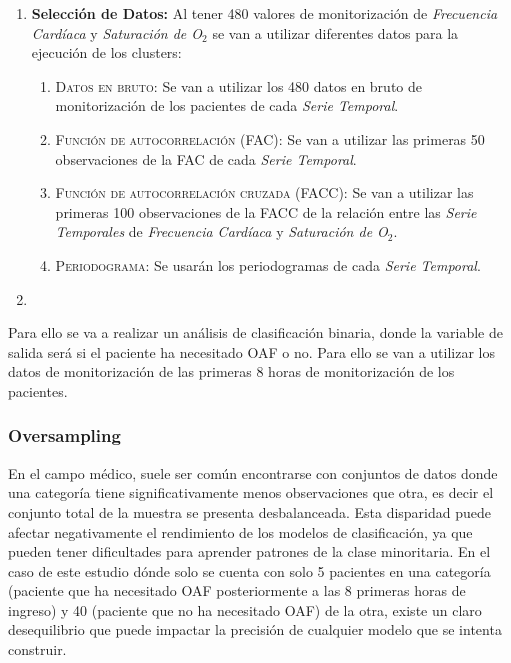 \begin{enumerate}
    \item \textbf{Selección de Datos:} Al tener 480 valores de monitorización de \textit{Frecuencia Cardíaca} y \textit{Saturación de O$_2$} se van a utilizar diferentes datos para la ejecución de los clusters:
    \begin{enumerate}
        \item \textsc{Datos en bruto:} Se van a utilizar los 480 datos en bruto de monitorización de los pacientes de cada \textit{Serie Temporal}.
        \item \textsc{Función de autocorrelación (FAC):} Se van a utilizar las primeras 50 observaciones de la FAC de cada \textit{Serie Temporal}.
        \item \textsc{Función de autocorrelación cruzada (FACC):} Se van a utilizar las primeras 100 observaciones de la FACC de la relación entre las \textit{Serie Temporales} de \textit{Frecuencia Cardíaca} y \textit{Saturación de O$_2$}.
        \item \textsc{Periodograma:} Se usarán los periodogramas de cada \textit{Serie Temporal}.
    \end{enumerate}
    
    \item 
\end{enumerate}


Para ello se va a realizar un análisis de clasificación binaria, donde la variable de salida será si el paciente ha necesitado OAF o no. Para ello se van a utilizar los datos de monitorización de las primeras $8$ horas de monitorización de los pacientes.











\subsubsection{Oversampling}\label{sec:oversampling}

En el campo médico, suele ser común encontrarse con conjuntos de datos donde una categoría tiene significativamente menos observaciones que otra, es decir el conjunto total de la muestra se presenta desbalanceada. Esta disparidad puede afectar negativamente el rendimiento de los modelos de clasificación, ya que pueden tener dificultades para aprender patrones de la clase minoritaria. En el caso de este estudio dónde solo se cuenta con solo 5 pacientes en una categoría (paciente que ha necesitado OAF posteriormente a las $8$ primeras horas de ingreso) y 40 (paciente que no ha necesitado OAF) de la  otra, existe un claro desequilibrio que puede impactar la precisión de cualquier modelo que se intenta construir.

